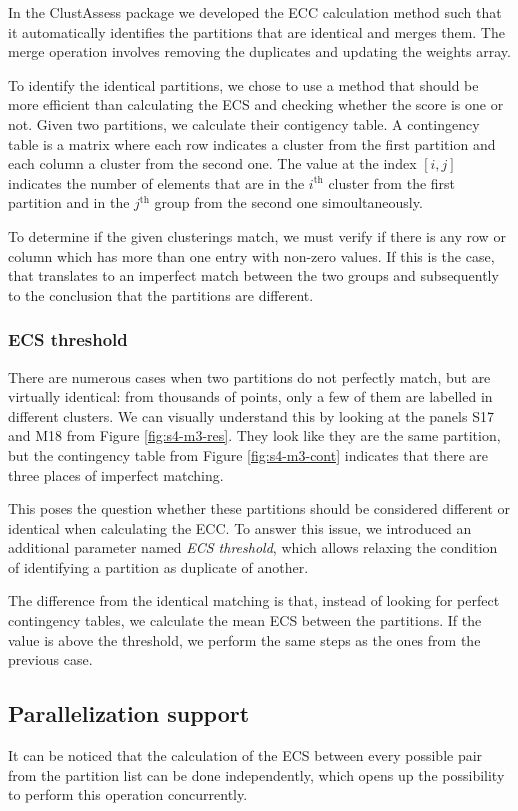 In the ClustAssess package we developed the ECC calculation method such that it automatically identifies the partitions that are identical and merges them. The merge operation involves removing the duplicates and updating the weights array.

To identify the identical partitions, we chose to use a method that should be more efficient than calculating the ECS and checking whether the score is one or not. Given two partitions, we calculate their contigency table. A contingency table is a matrix where each row indicates a cluster from the first partition and each column a cluster from the second one. The value at the index $[i, j]$ indicates the number of elements that are in the $i^\text{th}$ cluster from the first partition and in the $j^\text{th}$ group from the second one simoultaneously.

To determine if the given clusterings match, we must verify if there is any row or column which has more than one entry with non-zero values. If this is the case, that translates to an imperfect match between the two groups and subsequently to the conclusion that the partitions are different.

\subsubsection{ECS threshold}
There are numerous cases when two partitions do not perfectly match, but are virtually identical: from thousands of points, only a few of them are labelled in different clusters. We can visually understand this by looking at the panels S17 and M18 from Figure \ref{fig:s4-m3-res}. They look like they are the same partition, but the contingency table from Figure \ref{fig:s4-m3-cont} indicates that there are three places of imperfect matching.

This poses the question whether these partitions should be considered different or identical when calculating the ECC. To answer this issue, we introduced an additional parameter named \textit{ECS threshold}, which allows relaxing the condition of identifying a partition as duplicate of another.

The difference from the identical matching is that, instead of looking for perfect contingency tables, we calculate the mean ECS between the partitions. If the value is above the threshold, we perform the same steps as the ones from the previous case.

\subsection{Parallelization support}
It can be noticed that the calculation of the ECS between every possible pair from the partition list can be done independently, which opens up the possibility to perform this operation concurrently.

